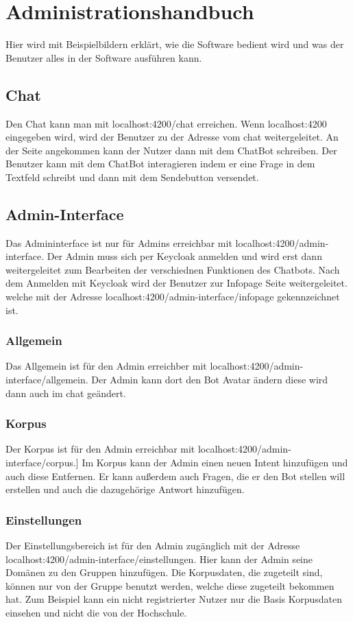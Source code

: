 \section{Administrationshandbuch}
Hier wird mit Beispielbildern erklärt, wie die Software bedient wird und was der Benutzer alles 
in der Software ausführen kann.

\subsection{Chat}
Den Chat kann man mit localhost:4200/chat erreichen. Wenn localhost:4200
eingegeben wird, wird der Benutzer zu der Adresse vom chat weitergeleitet.
An der Seite angekommen kann der Nutzer dann mit dem ChatBot schreiben. 
Der Benutzer kann mit dem ChatBot interagieren indem er eine Frage in dem Textfeld schreibt
und dann mit dem Sendebutton versendet.

\subsection{Admin-Interface}
Das Admininterface ist nur für Admins erreichbar mit localhost:4200/admin-interface. Der Admin muss sich per Keycloak
anmelden und wird erst dann weitergeleitet zum Bearbeiten der verschiednen Funktionen
des Chatbots.
Nach dem Anmelden mit Keycloak wird der Benutzer zur Infopage Seite weitergeleitet.
welche mit der Adresse localhost:4200/admin-interface/infopage gekennzeichnet ist.

\subsubsection{Allgemein}
Das Allgemein ist für den Admin erreichber mit localhost:4200/admin-interface/allgemein. 
Der Admin kann dort den Bot Avatar ändern diese wird dann auch im chat geändert.

\subsubsection{Korpus}
Der Korpus ist für den Admin erreichbar mit localhost:4200/admin-interface/corpus.]
Im Korpus kann der Admin einen neuen Intent hinzufügen und auch diese Entfernen. 
Er kann außerdem auch Fragen, die er den Bot stellen will erstellen und auch die 
dazugehörige Antwort hinzufügen.

\subsubsection{Einstellungen}
Der Einstellungsbereich ist für den Admin zugänglich mit der Adresse 
localhost:4200/admin-interface/einstellungen.
Hier kann der Admin seine Domänen zu den Gruppen hinzufügen. Die Korpusdaten, die zugeteilt sind,
können nur von der Gruppe benutzt werden, welche diese zugeteilt bekommen hat. 
Zum Beispiel kann ein nicht registrierter Nutzer nur die Basis Korpusdaten einsehen und nicht die von der Hochschule.

